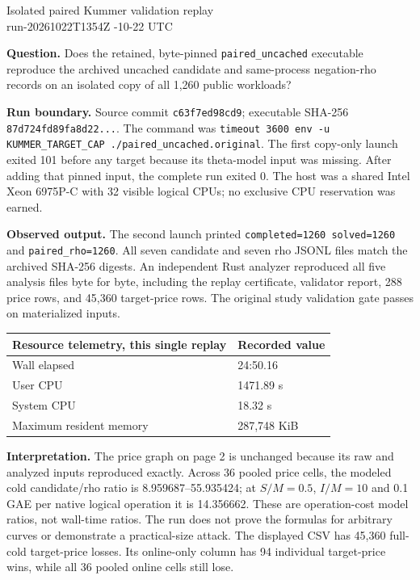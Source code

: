 \documentclass[10pt,a4paper]{article}
\begin{document}
\begin{center}
{\Large Isolated paired Kummer validation replay}\\[3pt]
{\small run-20261022T1354Z -10-22 UTC}
\end{center}

\textbf{Question.} Does the retained, byte-pinned \texttt{paired\_uncached}
executable reproduce the archived uncached candidate and same-process
negation-rho records on an isolated copy of all 1,260 public workloads?

\textbf{Run boundary.} Source commit \texttt{c63f7ed98cd9}; executable
SHA-256 \texttt{87d724fd89fa8d22...}. The command was
\texttt{timeout 3600 env -u KUMMER\_TARGET\_CAP ./paired\_uncached.original}.
The first copy-only launch exited 101 before any target because its theta-model
input was missing. After adding that pinned input, the complete run exited 0.
The host was a shared Intel Xeon 6975P-C with 32 visible logical CPUs; no
exclusive CPU reservation was earned.

\textbf{Observed output.} The second launch printed
\texttt{completed=1260 solved=1260} and \texttt{paired\_rho=1260}.
All seven candidate and seven rho JSONL files match the archived SHA-256
digests. An independent Rust analyzer reproduced all five analysis files byte
for byte, including the replay certificate, validator report, 288 price rows,
and 45,360 target-price rows. The original study validation gate passes on
materialized inputs.

\begin{center}
\begin{tabular}{ll}
\toprule
Resource telemetry, this single replay & Recorded value \\
\midrule
Wall elapsed & 24:50.16 \\
User CPU & 1471.89 s \\
System CPU & 18.32 s \\
Maximum resident memory & 287,748 KiB \\
\bottomrule
\end{tabular}
\end{center}

\textbf{Interpretation.} The price graph on page 2 is unchanged because its
raw and analyzed inputs reproduced exactly. Across 36 pooled price cells,
the modeled cold candidate/rho ratio is 8.959687--55.935424; at
$S/M=0.5$, $I/M=10$ and 0.1 GAE per native logical operation it is 14.356662.
These are operation-cost model ratios, not wall-time ratios. The run does not
prove the formulas for arbitrary curves or demonstrate a practical-size attack.
The displayed CSV has 45,360 full-cold target-price losses. Its online-only
column has 94 individual target-price wins, while all 36 pooled online cells
still lose.
\end{document}
